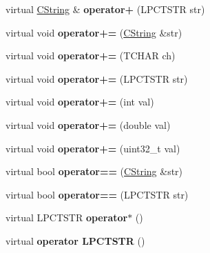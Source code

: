 \begin{DoxyCompactItemize}
\item 
\hypertarget{class_c_string_aed0a539d88caa84a10e42c56736b8585}{virtual \hyperlink{class_c_string}{C\-String} \& {\bfseries operator+} (L\-P\-C\-T\-S\-T\-R str)}\label{class_c_string_aed0a539d88caa84a10e42c56736b8585}

\item 
\hypertarget{class_c_string_a40bc4b86a267617199efa1bd1b4054eb}{virtual void {\bfseries operator+=} (\hyperlink{class_c_string}{C\-String} \&str)}\label{class_c_string_a40bc4b86a267617199efa1bd1b4054eb}

\item 
\hypertarget{class_c_string_aa65a2be961ede8c8894248c4d6faba79}{virtual void {\bfseries operator+=} (T\-C\-H\-A\-R ch)}\label{class_c_string_aa65a2be961ede8c8894248c4d6faba79}

\item 
\hypertarget{class_c_string_a776672751c58502039234d6c78832a9b}{virtual void {\bfseries operator+=} (L\-P\-C\-T\-S\-T\-R str)}\label{class_c_string_a776672751c58502039234d6c78832a9b}

\item 
\hypertarget{class_c_string_ad0593358c21cca96aca2403be6d6ec92}{virtual void {\bfseries operator+=} (int val)}\label{class_c_string_ad0593358c21cca96aca2403be6d6ec92}

\item 
\hypertarget{class_c_string_abee606394e7b160c90aaa492febecdee}{virtual void {\bfseries operator+=} (double val)}\label{class_c_string_abee606394e7b160c90aaa492febecdee}

\item 
\hypertarget{class_c_string_a33449318e0ed01e0307993e1f173747f}{virtual void {\bfseries operator+=} (uint32\-\_\-t val)}\label{class_c_string_a33449318e0ed01e0307993e1f173747f}

\item 
\hypertarget{class_c_string_a960b7b752e43ec86a0851e30fa9f5f16}{virtual bool {\bfseries operator==} (\hyperlink{class_c_string}{C\-String} \&str)}\label{class_c_string_a960b7b752e43ec86a0851e30fa9f5f16}

\item 
\hypertarget{class_c_string_a6aee7112647fd18a9161497494418e16}{virtual bool {\bfseries operator==} (L\-P\-C\-T\-S\-T\-R str)}\label{class_c_string_a6aee7112647fd18a9161497494418e16}

\item 
\hypertarget{class_c_string_aab798ff84e78c0bce521dad477bcdfa6}{virtual L\-P\-C\-T\-S\-T\-R {\bfseries operator$\ast$} ()}\label{class_c_string_aab798ff84e78c0bce521dad477bcdfa6}

\item 
\hypertarget{class_c_string_a9149db10490c1d9c4c969043877f3cdb}{virtual {\bfseries operator L\-P\-C\-T\-S\-T\-R} ()}\label{class_c_string_a9149db10490c1d9c4c969043877f3cdb}

\end{DoxyCompactItemize}


